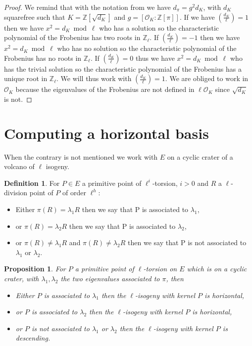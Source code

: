 \documentclass{article}
\theoremstyle{plain}
\newtheorem{prop}[thm]{Proposition}
\theoremstyle{definition}
\newtheorem{defi}[thm]{Definition}
\theoremstyle{remark}
\begin{document}
\begin{proof}
We remind that with the notation from \cite{Fouquet01} \cite{Kohel96} we have $d_{\pi}=g^2d_K$, with $d_K$ squarefree such that $K=\mathbb{Z}[\sqrt{d_K}]$ and $g=[\mathcal{O}_K:\mathbb{Z}[\pi]]$.
\newline
If we have $\left( \frac{d_K}{\ell} \right)=1$ then we have $x^2 = d_K \bmod \ell$ who has a solution so the characteristic polynomial of the Frobenius has two roots in $\mathbb{Z}_{\ell}$. If $\left( \frac{d_K}{\ell} \right)=-1$ then we have $x^2 = d_K \bmod \ell$ who has no solution so the characteristic polynomial of the Frobenius has no roots in $\mathbb{Z}_{\ell}$. If $\left( \frac{d_K}{\ell} \right)=0$ thus we have $x^2 = d_K \bmod \ell$ who has the trivial solution so the characteristic polynomial of the Frobenius has a unique root in $\mathbb{Z}_{\ell}$.
\newline
We will thus work with $\left( \frac{d_K}{\ell} \right)=1$. We are obliged to work in $\mathcal{O}_K$  because the eigenvalues of the Frobenius are not defined in $\ell \mathcal{O}_K$ since $\sqrt{d_K}$ is not.
\end{proof}



\section{Computing a horizontal basis}
When the contrary is  not mentioned we work with $E$ on a cyclic crater of a volcano of $\ell$ isogeny. 

\begin{defi}
For $P \in E$ a primitive point of $\ell^i$-torsion, $i>0$ and $R$ a $\ell$-division point of $P$ of order $\ell^h$:
\begin{itemize}
\item Either $\pi(R)=\lambda_1 R$ then we say that P is associated to $\lambda_1$, 
\item or $\pi(R)=\lambda_2 R$ then we say that P is associated to $\lambda_2$,
\item or $\pi(R)\neq \lambda_1 R$ and $\pi(R)\neq \lambda_2 R$ then we say that P is not associated to $\lambda_1$ or $\lambda_2$.
\end{itemize}  
\end{defi}

\begin{prop} \label{conjecture}
For $P$ a primitive point of $\ell$-torsion on $E$ which is on a cyclic crater, with $\lambda_1, \lambda_2$ the two eigenvalues associated to $\pi$, then
\begin{itemize}
\item Either $P$ is associated to $\lambda_1$ then the $\ell$-isogeny with kernel $P$ is horizontal,
\item or $P$ is associated to $\lambda_2$ then the $\ell$-isogeny with kernel $P$ is horizontal,
\item or $P$ is not associated to $\lambda_1$ or $\lambda_2$ then the $\ell$-isogeny with kernel $P$ is descending.
\end{itemize} 
\end{prop}
\end{document}
